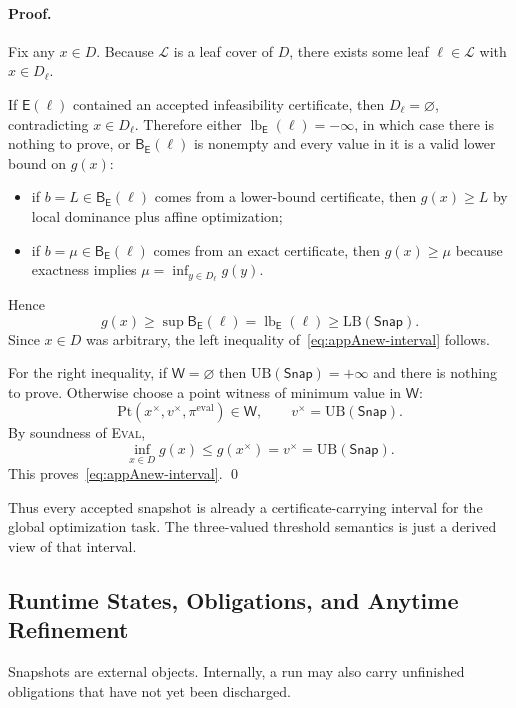 \paragraph{\normalfont Proof.}
Fix any $x\in D$. Because $\mathcal L$ is a leaf cover of $D$, there exists some leaf $\ell\in\mathcal L$ with $x\in D_\ell$.

If $\mathsf E(\ell)$ contained an accepted infeasibility certificate, then $D_\ell=\varnothing$, contradicting $x\in D_\ell$. Therefore either $\operatorname{lb}_{\mathsf E}(\ell)=-\infty$, in which case there is nothing to prove, or $\mathsf B_{\mathsf E}(\ell)$ is nonempty and every value in it is a valid lower bound on $g(x)$:
\begin{itemize}
    \item if $b=L\in \mathsf B_{\mathsf E}(\ell)$ comes from a lower-bound certificate, then $g(x)\ge L$ by local dominance plus affine optimization;
    \item if $b=\mu\in \mathsf B_{\mathsf E}(\ell)$ comes from an exact certificate, then $g(x)\ge \mu$ because exactness implies $\mu=\inf_{y\in D_\ell} g(y)$.
\end{itemize}
Hence
\[
g(x)\ge \sup \mathsf B_{\mathsf E}(\ell)=\operatorname{lb}_{\mathsf E}(\ell)\ge \mathrm{LB}(\mathsf{Snap}).
\]
Since $x\in D$ was arbitrary, the left inequality of~\eqref{eq:appAnew-interval} follows.

For the right inequality, if $\mathsf W=\varnothing$ then $\mathrm{UB}(\mathsf{Snap})=+\infty$ and there is nothing to prove. Otherwise choose a point witness of minimum value in $\mathsf W$:
\[
\mathrm{Pt}(x^\times,v^\times,\pi^{\mathrm{eval}})\in\mathsf W,
\qquad
v^\times=\mathrm{UB}(\mathsf{Snap}).
\]
By soundness of \textsc{Eval},
\[
\inf_{x\in D} g(x)\le g(x^\times)=v^\times=\mathrm{UB}(\mathsf{Snap}).
\]
This proves~\eqref{eq:appAnew-interval}. \qed

Thus every accepted snapshot is already a certificate-carrying interval for the global optimization task. The three-valued threshold semantics is just a derived view of that interval.

\subsection{Runtime States, Obligations, and Anytime Refinement}

Snapshots are external objects. Internally, a run may also carry unfinished obligations that have not yet been discharged.

